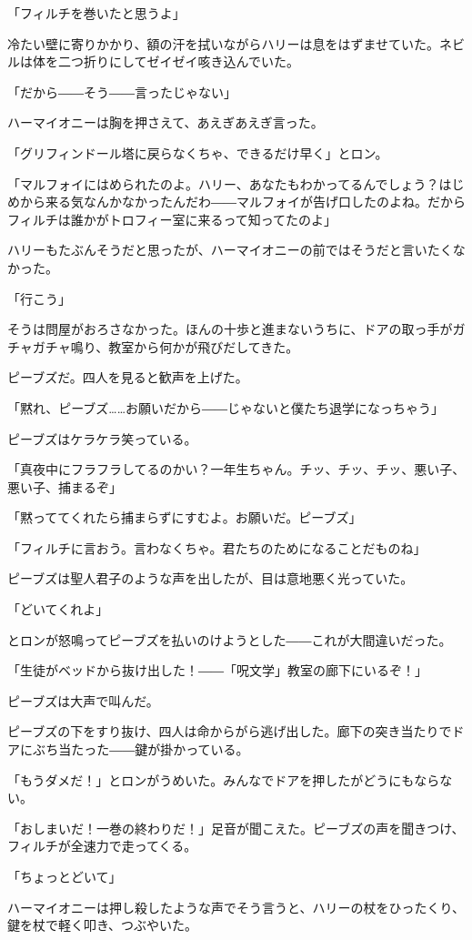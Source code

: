 \documentclass[10pt,a4paper]{article}
\begin{document}
\begin{CJK}{UTF8}{min}
「フィルチを巻いたと思うよ」

冷たい壁に寄りかかり、額の汗を拭いながらハリーは息をはずませていた。ネビルは体を二つ折りにしてゼイゼイ咳き込んでいた。

「だから――そう――言ったじゃない」

ハーマイオニーは胸を押さえて、あえぎあえぎ言った。

「グリフィンドール塔に戻らなくちゃ、できるだけ早く」とロン。

「マルフォイにはめられたのよ。ハリー、あなたもわかってるんでしょう？はじめから来る気なんかなかったんだわ――マルフォイが告げ口したのよね。だからフィルチは誰かがトロフィー室に来るって知ってたのよ」

ハリーもたぶんそうだと思ったが、ハーマイオニーの前ではそうだと言いたくなかった。

「行こう」

そうは問屋がおろさなかった。ほんの十歩と進まないうちに、ドアの取っ手がガチャガチャ鳴り、教室から何かが飛びだしてきた。

ピーブズだ。四人を見ると歓声を上げた。

「黙れ、ピーブズ……お願いだから――じゃないと僕たち退学になっちゃう」

ピーブズはケラケラ笑っている。

「真夜中にフラフラしてるのかい？一年生ちゃん。チッ、チッ、チッ、悪い子、悪い子、捕まるぞ」

「黙っててくれたら捕まらずにすむよ。お願いだ。ピーブズ」

「フィルチに言おう。言わなくちゃ。君たちのためになることだものね」

ピーブズは聖人君子のような声を出したが、目は意地悪く光っていた。

「どいてくれよ」

とロンが怒鳴ってピーブズを払いのけようとした――これが大間違いだった。

「生徒がベッドから抜け出した！――「呪文学」教室の廊下にいるぞ！」

ピーブズは大声で叫んだ。

ピーブズの下をすり抜け、四人は命からがら逃げ出した。廊下の突き当たりでドアにぶち当たった――鍵が掛かっている。

「もうダメだ！」とロンがうめいた。みんなでドアを押したがどうにもならない。

「おしまいだ！一巻の終わりだ！」足音が聞こえた。ピーブズの声を聞きつけ、フィルチが全速力で走ってくる。

「ちょっとどいて」

ハーマイオニーは押し殺したような声でそう言うと、ハリーの杖をひったくり、鍵を杖で軽く叩き、つぶやいた。


\end{CJK}
\end{document}
